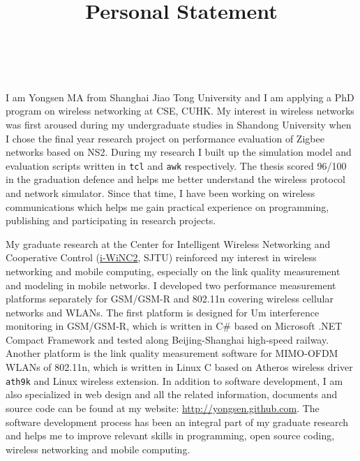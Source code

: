 \documentclass[conference,onecolumn]{IEEEtran}
\title{Personal Statement}
\author{\IEEEauthorblockN{Yongsen MA} \\
}
\begin{document}
\maketitle%

I am Yongsen MA from Shanghai Jiao Tong University and I am applying a PhD program on wireless networking at CSE, CUHK. My interest in wireless networks was first aroused during my undergraduate studies in Shandong University when I chose the final year research project on performance evaluation of Zigbee networks based on NS2. During my research I built up the simulation model and evaluation scripts written in \verb"tcl" and \verb"awk" respectively. The thesis scored 96/100 in the graduation defence and helps me better understand the wireless protocol and network simulator. Since that time, I have been working on wireless communications which helps me gain practical experience on programming, publishing and participating in research projects.

My graduate research at the Center for Intelligent Wireless Networking and Cooperative Control (\href{http://wicnc.sjtu.edu.cn}{i-WiNC2}, SJTU) reinforced my interest in wireless networking and mobile computing, especially on the link quality measurement and modeling in mobile networks. I developed two performance measurement platforms separately for GSM/GSM-R and 802.11n covering wireless cellular networks and WLANs. The first platform is designed for Um interference monitoring in GSM/GSM-R, which is written in C\# based on Microsoft .NET Compact Framework and tested along Beijing-Shanghai high-speed railway. Another platform is the link quality measurement software for MIMO-OFDM WLANs of 802.11n, which is written in Linux C based on Atheros wireless driver \texttt{ath9k} and Linux wireless extension. In addition to software development, I am also specialized in web design and all the related information, documents and source code can be found at my website: \url{http://yongsen.github.com}. The software development process has been an integral part of my graduate research and helps me to improve relevant skills in programming, open source coding, wireless networking and mobile computing.
\end{document}
